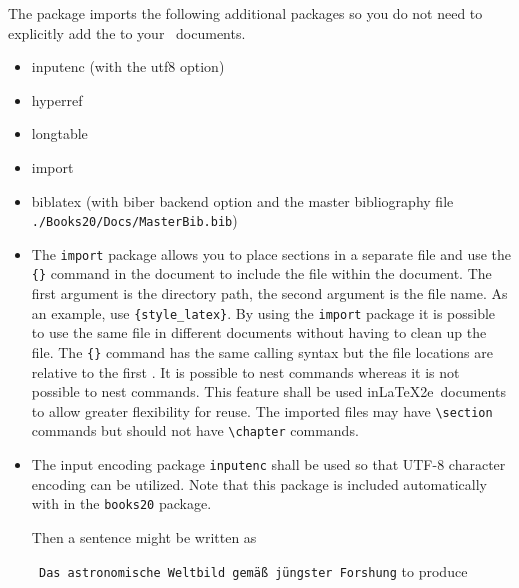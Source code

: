 The package imports the following additional packages so you
do not need to explicitly add the to your \LaTeXe\ documents.

\begin{itemize}
\item inputenc \cite{Jeffrey2018} (with the utf8 option)
\item hyperref \cite{Rahtz2017}
\item longtable \cite{Carlisle2014}
\item import \cite{Arseneau2009}
\item biblatex \cite{Lehman2018} (with biber backend option and the
  master bibliography file \texttt{./Books20/Docs/MasterBib.bib})
\end{itemize}


\begin{itemize}
\item The \texttt{import} package allows you to place sections in a
  separate file and use the \verb|{}| command in the document
  to include the file within the document. The first argument is the
  directory path, the second argument is the file name. As an example,
  use \verb|{style_latex}|.  By using the \texttt{import}
  package it is possible to use the same file in different documents
  without having to clean up the file. The \verb|{}|
  command has the same calling syntax but the file locations are
  relative to the first \verb||. It is possible to nest
  \verb|| commands whereas it is not possible to nest
  \verb|| commands. This feature shall be used inLaTeX2e\
  documents to allow greater flexibility for reuse. The imported
  files may have \verb|\section| commands but should not have
  \verb|\chapter| commands.

\item {The input encoding package \texttt{inputenc} shall be used
  so that UTF-8 character encoding can be utilized. Note that this
  package is included automatically with in the \texttt{books20} package.

  Then a sentence might be written as
  
  \verb| Das astronomische Weltbild gemäß jüngster Forshung|
  to produce

}
\end{itemize}
